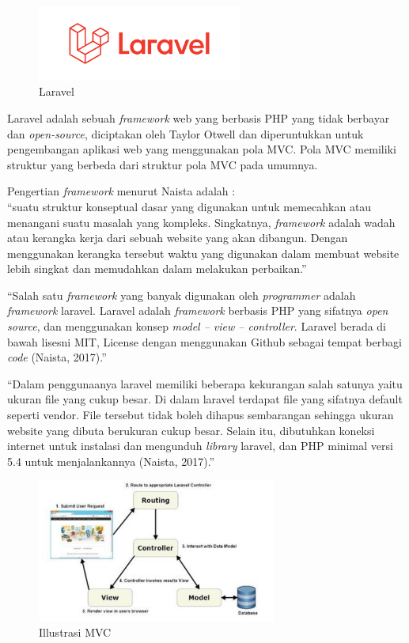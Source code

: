 \begin{figure}
	\centering
	\includegraphics[width=0.6\textwidth]
	{pics/laravel.png}
	\caption{Laravel}
	\label{fig:31}
\end{figure}

Laravel adalah sebuah \textit{framework} web yang berbasis PHP yang tidak berbayar dan \textit{open-source}, diciptakan oleh Taylor Otwell dan diperuntukkan untuk pengembangan aplikasi web yang menggunakan pola MVC. Pola MVC memiliki struktur yang berbeda dari struktur pola MVC pada umumnya.

Pengertian \textit{framework} menurut Naista adalah : \\
“suatu struktur konseptual dasar yang digunakan untuk memecahkan atau menangani suatu masalah yang kompleks. Singkatnya, \textit{framework} adalah wadah atau kerangka kerja dari sebuah website yang akan dibangun. Dengan menggunakan kerangka tersebut waktu yang digunakan dalam membuat website lebih singkat dan memudahkan dalam melakukan perbaikan.”

“Salah satu \textit{framework} yang banyak digunakan oleh \textit{programmer} adalah \textit{framework} laravel. Laravel adalah \textit{framework} berbasis PHP yang sifatnya \textit{open source}, dan menggunakan konsep \textit{model – view – controller}. Laravel berada di bawah lisesni MIT, License dengan menggunakan Github sebagai tempat berbagi \textit{code} (Naista, 2017).”

“Dalam penggunaanya laravel memiliki beberapa kekurangan salah satunya yaitu ukuran file yang cukup besar. Di dalam laravel terdapat file yang sifatnya default seperti vendor. File tersebut tidak boleh dihapus sembarangan sehingga ukuran website yang dibuta berukuran cukup besar. Selain itu, dibutuhkan koneksi internet untuk instalasi dan mengunduh \textit{library} laravel, dan PHP minimal versi 5.4 untuk menjalankannya (Naista, 2017).” 

\begin{figure}
	\centering
	\includegraphics[width=0.7\textwidth]
	{pics/ilustrasimvc.jpg}
	\caption{Illustrasi MVC}
	\label{fig:31}
\end{figure}


